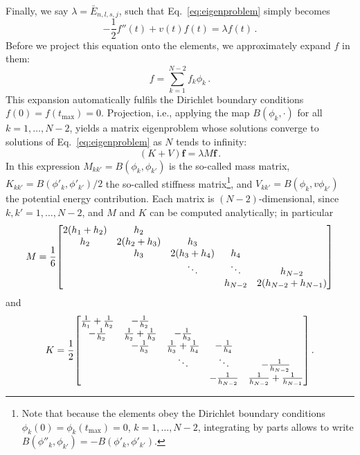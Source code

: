 \documentclass[fontsize=12pt,
               twoside=false,
               BCOR=0mm,
               DIV=14,
               overfullrule=true, %
               toc=bibliography,
               headinclude=true,
               footinclude=false]{scrartcl}
\numberwithin{equation}{section}
\begin{document}
    Finally, we say $\lambda=\bar{E}_{n,l,s,j}$, such that
    Eq.~\eqref{eq:eigenproblem} simply becomes
    \begin{equation}
        -\frac{1}{2}f''(t) + v(t) f(t) = \lambda f(t)
    \,.
    \end{equation}
    Before we project this equation onto the elements, we approximately expand
    $f$ in them:
    \begin{equation}\label{eq:expansionOfState}
        f = \sum^{N-2}_{k=1} f_k \phi_k
    \,.
    \end{equation}
    This expansion automatically fulfils the Dirichlet boundary conditions
    $f(0)=f(t_\mathrm{max})=0$. Projection, i.e., applying the map
    $B(\phi_k,\cdot)$ for all $k=1,\dots,N-2$, yields a matrix eigenproblem
    whose solutions converge to solutions of Eq.~\eqref{eq:eigenproblem} as $N$
    tends to infinity:
    \begin{equation}\label{eq:matrixEigenproblem}
        (K+V) \bm{f} = \lambda M \bm{f}
    \,.
    \end{equation}
    In this expression $M_{kk'}=B(\phi_k,\phi_{k'})$ is the so-called mass
    matrix, $K_{kk'}=B(\phi'_k,\phi'_{k'})\slash{2}$ the so-called stiffness
    matrix\footnote{Note that because the elements obey the Dirichlet boundary
    conditions $\phi_k(0)=\phi_k(t_\mathrm{max})=0$, $k=1,\dots,N-2$,
    integrating by parts allows to write
    $B(\phi''_k,\phi_{k'})=-B(\phi'_k,\phi'_{k'})$.}, and
    $V_{kk'}=B(\phi_k,v\phi_{k'})$ the potential energy contribution. Each
    matrix is $(N-2)$-dimensional, since $k,k'=1,\dots,N-2$, and $M$ and $K$ can
    be computed analytically; in particular
    \begin{equation}
        M
        =
        \frac{1}{6}
        \mqty[2(h_1+h_2) &  h_2 & & & \\
              h_2 & 2(h_2+h_3) & h_3 & & \\
              & h_3 & 2(h_3+h_4) & h_4 & \\
              & & \ddots & \ddots & h_{N-2} \\
              & & & h_{N-2} & 2(h_{N-2}+h_{N-1})]
    \end{equation}
    and
    \begin{equation}
        K = \frac{1}{2}
            \mqty[\frac{1}{h_1}+\frac{1}{h_2} & -\frac{1}{h_2} & \\
                  -\frac{1}{h_2} & \frac{1}{h_2}+\frac{1}{h_3} & -\frac{1}{h_3}
                  & \\
                  & -\frac{1}{h_3} & \frac{1}{h_3}+\frac{1}{h_4} &
                  -\frac{1}{h_4} & \\
                  & & \ddots & \ddots & -\frac{1}{h_{N-2}} \\
                  & & & -\frac{1}{h_{N-2}} & \frac{1}{h_{N-2}}+\frac{1}{h_{N-1}}
                  ]
    \,.
    \end{equation}
\end{document}
